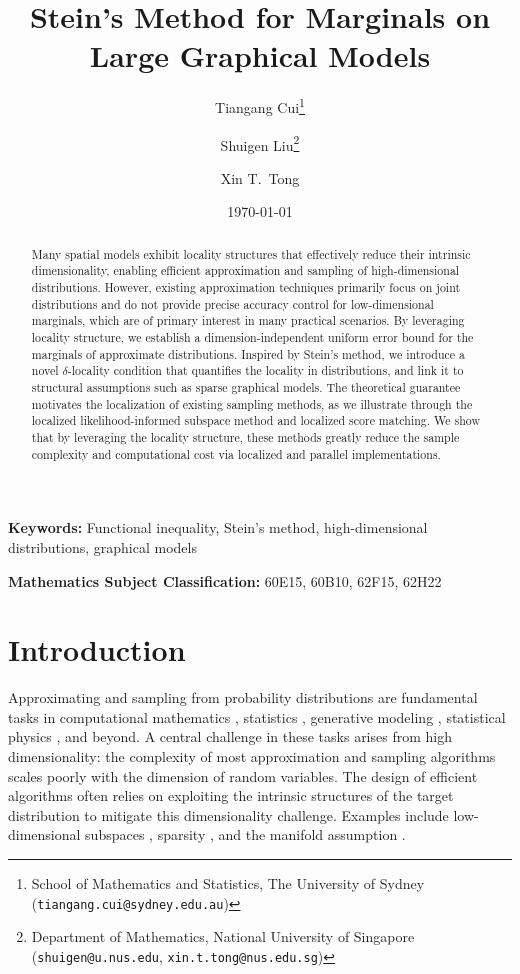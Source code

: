 \documentclass[11pt]{article}
\title{Stein's Method for Marginals on Large Graphical Models}
\author{Tiangang Cui\thanks{School of Mathematics and Statistics, The University of Sydney (\texttt{tiangang.cui@sydney.edu.au})} \and Shuigen Liu\thanks{Department of Mathematics, National University of Singapore (\texttt{shuigen@u.nus.edu}, \texttt{xin.t.tong@nus.edu.sg})} \and Xin T.~Tong\footnotemark[2]}
\date{\today}
\begin{document}
\maketitle

\begin{abstract}
Many spatial models exhibit locality structures that effectively reduce their intrinsic dimensionality, enabling efficient approximation and sampling of high-dimensional distributions. 
However, existing approximation techniques primarily focus on joint distributions and do not provide precise accuracy control for low-dimensional marginals, which are of primary interest in many practical scenarios.
By leveraging locality structure, we establish a dimension-independent uniform error bound for the marginals of approximate distributions.
Inspired by Stein's method, we introduce a novel $\delta$-locality condition that quantifies the locality in distributions, and link it to structural assumptions such as sparse graphical models. 
The theoretical guarantee motivates the localization of existing sampling methods, as we illustrate through the localized likelihood-informed subspace method and localized score matching. 
We show that by leveraging the locality structure, these methods greatly reduce the sample complexity and computational cost via localized and parallel implementations.
\end{abstract}


\bigskip
\noindent\textbf{Keywords:} Functional inequality, Stein's method, high-dimensional distributions, graphical models

\bigskip
\noindent\textbf{Mathematics Subject Classification:}  60E15, 60B10, 62F15, 62H22


\section{Introduction}
\label{sec:Intro}

Approximating and sampling from probability distributions are fundamental tasks in computational mathematics \cite{MR3274599,24M1694781,chen2026convergence}, statistics \cite{MR964183,chewi2023logconcave,MR373208}, generative modeling \cite{kingma2013auto,NIPS2014_5ca3e9b1,NEURIPS2020_4c5bcfec}, statistical physics \cite{MR373208,clifford1990markov}, and beyond.
%
A central challenge in these tasks arises from high dimensionality: the complexity of most approximation and sampling algorithms scales poorly with the dimension of random variables.
%
The design of efficient algorithms often relies on exploiting the intrinsic structures of the target distribution to mitigate this dimensionality challenge.
%
Examples include low-dimensional subspaces \cite{MR3274599,MR4474562}, sparsity \cite{10.5555/2834535}, and the manifold assumption \cite{kingma2013auto,NIPS2014_5ca3e9b1}. 
\end{document}
